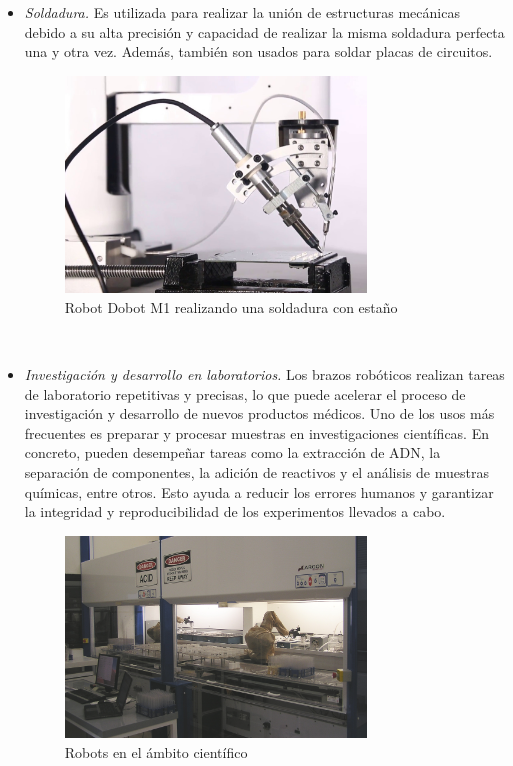 \begin{itemize}
  \item \textit{Soldadura.} Es utilizada para realizar la unión de estructuras mecánicas debido a su alta precisión y capacidad de realizar 
                            la misma soldadura perfecta una y otra vez. Además, también son usados para soldar placas de circuitos.
  \begin{figure} [h!]
    \begin{center}
      \includegraphics[width=8cm]{figs/solder_robot.jpg}
    \end{center}
    \caption{Robot Dobot M1 realizando una soldadura con estaño}
    \label{fig:robSoldering}
  \end{figure}\ 
\newpage
  \item \textit{Investigación y desarrollo en laboratorios.} Los brazos robóticos realizan tareas de laboratorio repetitivas y precisas, 
                              lo que puede acelerar el proceso de investigación y desarrollo de nuevos productos médicos. Uno de los usos más 
                              frecuentes es preparar y procesar muestras en investigaciones científicas. En concreto, pueden desempeñar tareas
                              como la extracción de \ac{ADN}, la separación de componentes, la adición de reactivos y el análisis de muestras 
                              químicas, entre otros. Esto ayuda a reducir los errores humanos y garantizar la integridad y reproducibilidad 
                              de los experimentos llevados a cabo.
  
  \begin{figure} [h!]
    \begin{center}
      \includegraphics[width=8cm]{figs/lab_robot.jpg}
    \end{center}
    \caption{Robots en el ámbito científico}
    \label{fig:robLaboratory}
  \end{figure}\ 

 \end{itemize}\



